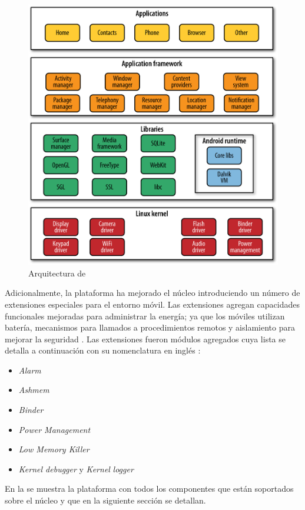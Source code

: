 \begin{figure}[H]
\begin{centering}
\includegraphics[width=0.7\columnwidth]{capitulo-5/graphics/android_stack}
\par\end{centering}
\caption[Arquitectura de Android]{\label{fig5:android-stack}Arquitectura de }
\end{figure}

Adicionalmente, la plataforma ha mejorado el núcleo introduciendo
un número de extensiones especiales para el entorno móvil. Las extensiones
agregan capacidades funcionales mejoradas para administrar la energía;
ya que los móviles utilizan batería, mecanismos para llamados a procedimientos
remotos y aislamiento para mejorar la seguridad \cite{Gargenta2014}.
Las extensiones fueron módulos agregados cuya lista se detalla a continuación
con su nomenclatura en inglés \cite{Schreiber2011}: 
\begin{itemize}
\item \emph{Alarm }
\item \emph{Ashmem}
\item \emph{Binder}
\item \emph{Power Management}
\item \emph{Low Memory Killer}
\item \emph{Kernel debugger} y \emph{Kernel} \emph{logger}
\end{itemize}
En la  se muestra la plataforma \emph{}
con todos los componentes que están soportados sobre el núcleo y que
en la siguiente sección se detallan.

